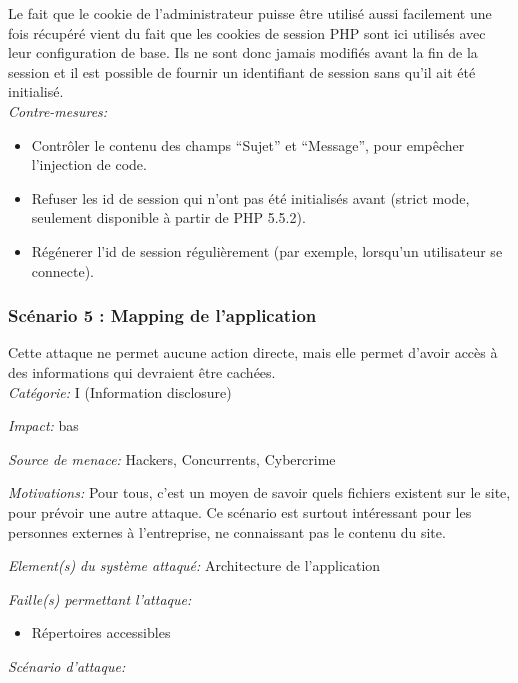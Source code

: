 \documentclass{article}
\begin{document}
Le fait que le cookie de l'administrateur puisse être utilisé aussi
facilement une fois récupéré vient du fait que les cookies de session
PHP sont ici utilisés avec leur configuration de base. Ils ne sont donc
jamais modifiés avant la fin de la session et il est possible de fournir
un identifiant de session sans qu'il ait été initialisé.\\

\textit{Contre-mesures:}

\begin{itemize}

\item
  Contrôler le contenu des champs ``Sujet'' et ``Message'', pour
  empêcher l'injection de code.
\item
  Refuser les id de session qui n'ont pas été initialisés avant (strict
  mode, seulement disponible à partir de PHP 5.5.2).
\item
  Régénerer l'id de session régulièrement (par exemple, lorsqu'un
  utilisateur se connecte).
\end{itemize}

\subsubsection{Scénario 5 : Mapping de l'application}

Cette attaque ne permet aucune action directe, mais elle permet d'avoir
accès à des informations qui devraient être cachées.\\

\textit{Catégorie:} I (Information disclosure)

\textit{Impact:} bas

\textit{Source de menace:} Hackers, Concurrents, Cybercrime

\textit{Motivations:} Pour tous, c'est un moyen de savoir quels fichiers existent sur le
  site, pour prévoir une autre attaque. Ce scénario est surtout
  intéressant pour les personnes externes à l'entreprise, ne connaissant
  pas le contenu du site.

\textit{Element(s) du système attaqué:} Architecture de l'application

\textit{Faille(s) permettant l'attaque:}

\begin{itemize}

\item
  Répertoires accessibles
\end{itemize}

\textit{Scénario d'attaque:}
\end{document}
